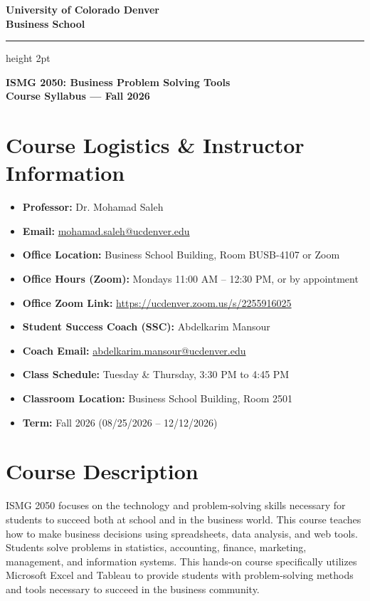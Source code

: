 \documentclass[11pt,a4paper]{article}
\begin{document}
\begin{center}
    {\LARGE \bfseries University of Colorado Denver} \\
    \vspace{2mm}
    {\Large \bfseries Business School} \\
    \vspace{4mm}
    {\color{cudenvergold}\hrule height 2pt}
    \vspace{3mm}
    {\large \bfseries ISMG 2050: Business Problem Solving Tools} \\
    {\large \bfseries Course Syllabus --- Fall 2026} \\
\end{center}

\vspace{0.5cm}

\section*{Course Logistics \& Instructor Information}
\begin{itemize}[leftmargin=*]
    \item \textbf{Professor:} Dr. Mohamad Saleh
    \item \textbf{Email:} \href{mailto:mohamad.saleh@ucdenver.edu}{mohamad.saleh@ucdenver.edu} 
    \item \textbf{Office Location:} Business School Building, Room BUSB-4107 or Zoom
    \item \textbf{Office Hours (Zoom):} Mondays 11:00 AM -- 12:30 PM, or by appointment
    \item \textbf{Office Zoom Link:} \url{https://ucdenver.zoom.us/s/2255916025}
    \item \textbf{Student Success Coach (SSC):} Abdelkarim Mansour
    \item \textbf{Coach Email:} \href{mailto:abdelkarim.mansour@ucdenver.edu}{abdelkarim.mansour@ucdenver.edu}
    \item \textbf{Class Schedule:} Tuesday \& Thursday, 3:30 PM to 4:45 PM
    \item \textbf{Classroom Location:} Business School Building, Room 2501
    \item \textbf{Term:} Fall 2026 (08/25/2026 -- 12/12/2026)
\end{itemize}

\section*{Course Description}
ISMG 2050 focuses on the technology and problem-solving skills necessary for students to succeed both at school and in the business world. This course teaches how to make business decisions using spreadsheets, data analysis, and web tools. Students solve problems in statistics, accounting, finance, marketing, management, and information systems. This hands-on course specifically utilizes Microsoft Excel and Tableau to provide students with problem-solving methods and tools necessary to succeed in the business community.
\end{document}
